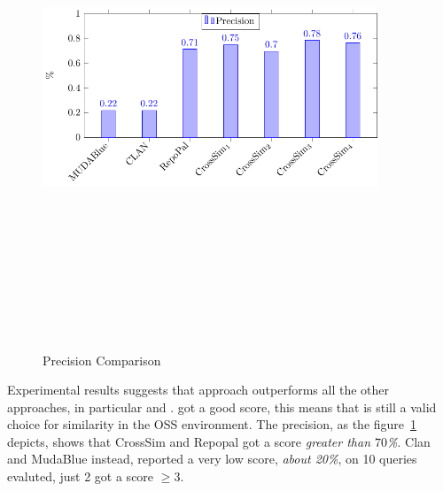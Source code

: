 \begin{figure}[!h]
\includegraphics[width=10cm,height=15cm,keepaspectratio]{images/Precision.pdf}
\centering
\caption{Precision Comparison}
\label{fig:Precision}
\end{figure}


Experimental results suggests that \CrossSim approach outperforms all the other approaches, in particular \MUDABlue and \CLAN. \RepoPal got a good score, this means that is still a valid choice for similarity in the OSS environment. The precision, as the figure~\ref{fig:Precision} depicts, shows that CrossSim and Repopal got a score \emph{greater than $70$\%}. Clan and MudaBlue instead, reported a very low score, \emph{about 20\%}, on 10 queries evaluted, just 2 got a score \emph{$\geq3$}.


